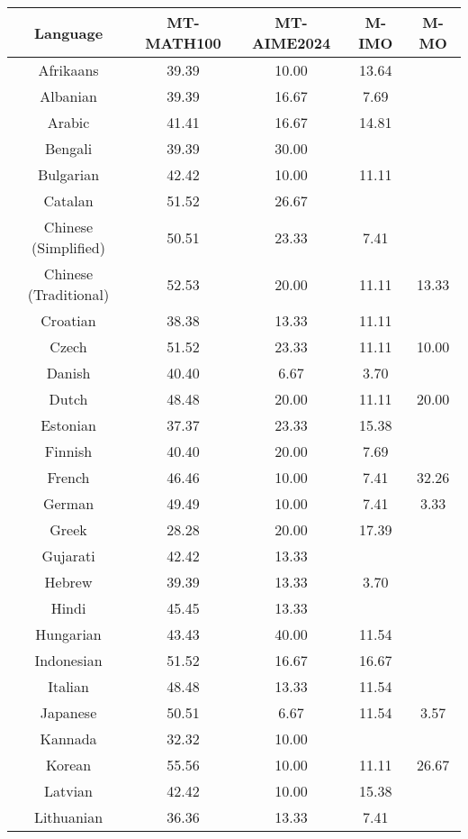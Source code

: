 \begin{table*}[]
\centering
\fontsize{9}{11} \selectfont
\begin{tabular}{c|cccc}
\toprule
\textbf{Language} & \textbf{MT-MATH100} & \textbf{MT-AIME2024} & \textbf{M-IMO} & \textbf{M-MO} \\ \midrule
Afrikaans & 39.39 & 10.00 & 13.64 &  \\
Albanian & 39.39 & 16.67 & 7.69 &  \\
Arabic & 41.41 & 16.67 & 14.81 &  \\
Bengali & 39.39 & 30.00 & \multicolumn{1}{l}{} &  \\
Bulgarian & 42.42 & 10.00 & 11.11 &  \\
Catalan & 51.52 & 26.67 & \multicolumn{1}{l}{} &  \\
Chinese (Simplified) & 50.51 & 23.33 & 7.41 &  \\
Chinese (Traditional) & 52.53 & 20.00 & 11.11 & \multirow{-2}{*}{13.33} \\
Croatian & 38.38 & 13.33 & 11.11 &  \\
Czech & 51.52 & 23.33 & 11.11 & 10.00 \\
Danish & 40.40 & 6.67 & 3.70 &  \\
Dutch & 48.48 & 20.00 & 11.11 & 20.00 \\
Estonian & 37.37 & 23.33 & 15.38 &  \\
Finnish & 40.40 & 20.00 & 7.69 &  \\
French & 46.46 & 10.00 & 7.41 & 32.26 \\
German & 49.49 & 10.00 & 7.41 & 3.33 \\
Greek & 28.28 & 20.00 & 17.39 &  \\
Gujarati & 42.42 & 13.33 & \multicolumn{1}{l}{} &  \\
Hebrew & 39.39 & 13.33 & 3.70 &  \\
Hindi & 45.45 & 13.33 & \multicolumn{1}{l}{} &  \\
Hungarian & 43.43 & 40.00 & 11.54 &  \\
Indonesian & 51.52 & 16.67 & 16.67 &  \\
Italian & 48.48 & 13.33 & 11.54 &  \\
Japanese & 50.51 & 6.67 & 11.54 & 3.57 \\
Kannada & 32.32 & 10.00 & \multicolumn{1}{l}{} &  \\
Korean & 55.56 & 10.00 & 11.11 & 26.67 \\
Latvian & 42.42 & 10.00 & 15.38 &  \\
Lithuanian & 36.36 & 13.33 & 7.41 &  \\

\end{tabular}
\end{table*}
